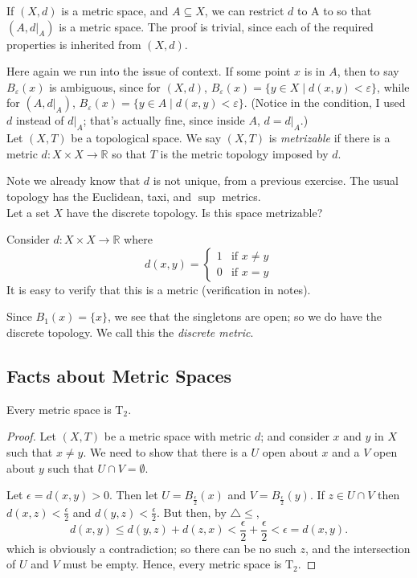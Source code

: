 \documentclass[12pt]{report}
\newcommand{\example}{  \noindent{\sc Example }\hspace{5pt} }
\newcommand{\define}{  \noindent{\sc Definition }\hspace{5pt} }
\newcommand{\claim}{ \noindent{\sc Claim }\hspace{5pt} }
\newcommand{\reals}{\mathbb{R}}
\newcommand{\T}[1]{$\textrm{T}_#1$}
\newcommand{\eball}{B_\varepsilon}
\newcommand{\ball}[1]{B_{#1}}
\newcommand{\triineq}{$\bigtriangleup \leq$}
\begin{document}
If $(X,d)$ is a metric space, and $A \subseteq X$, we can restrict $d$ to A to
so that $(A,d|_A)$ is a metric space. The proof is trivial, since each of
the required properties is inherited from $(X,d)$.

Here again we run into the issue of context. If some point $x$ is in $A$, then
to say $\eball(x)$ is ambiguous, since for $(X,d)$, $\eball(x) = \{y \in X \mid
d(x,y) < \varepsilon\}$, while for $(A,d|_A)$, $\eball(x) = \{y \in A \mid
d(x,y) < \varepsilon\}$. (Notice in the condition, I used $d$ instead of
$d|_A$; that's actually fine, since inside $A$, $d = d|_A$.)\\


\define Let $(X,T)$ be a topological space. We say $(X,T)$ is
 {\em metrizable} if there is a metric $d:X \times X
\rightarrow \reals$ so that $T$ is the metric topology imposed by $d$. 

Note we already know that $d$ is not unique, from a previous exercise. The
usual topology has the Euclidean, taxi, and $\sup$ metrics.\\

\example Let a set $X$ have the discrete topology. Is this space metrizable?

Consider $d: X \times X \rightarrow \reals$ where 
\begin{displaymath}
d(x,y) = \left\{ \begin{array}{ll}

1 & \textrm{if } x \neq y \\
0 & \textrm{if } x = y
\end{array} \right.
\end{displaymath}
It is easy to verify that this is a metric (verification in
notes).

Since $\ball{1}(x) = \{x\}$, we see that the singletons are open; so we do
have the discrete topology. We call this the  {\em
discrete metric}.

\subsection{Facts about Metric Spaces}

\claim Every metric space is \T{2}.

\begin{proof} Let $(X,T)$ be a metric space with metric $d$; and consider $x$
and $y$ in $X$ such that $x \neq y$.  We need to show that there is a $U$ open
about $x$ and a $V$ open about $y$ such that $U \cap V = \emptyset$.

Let $\epsilon  = d(x,y) > 0$. Then let $U = \ball{\frac{\epsilon}{2}}(x)$ and
$V = \ball{\frac{\epsilon}{2}}(y)$.  If $z \in U \cap V$ then $d(x,z) <
\frac{\epsilon}{2}$ and $d(y,z) < \frac{\epsilon}{2}$. But then, by \triineq,
\begin{displaymath}
d(x,y) \leq d(y,z) + d(z,x) < \frac{\epsilon}{2} + \frac{\epsilon}{2}
< \epsilon = d(x,y).
\end{displaymath}
which is obviously a contradiction; so there can be no such $z$, and the
intersection of $U$ and $V$ must be empty. Hence, every metric space is \T{2}.
\end{proof}
\end{document}
